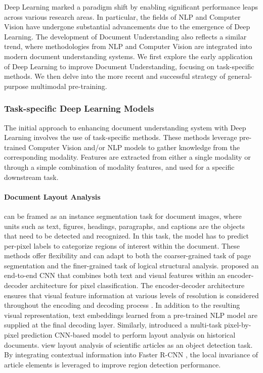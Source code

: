 Deep Learning marked a paradigm shift by enabling significant performance leaps across various research areas. In particular, the fields of \ac{NLP} and Computer Vision have undergone substantial advancements due to the emergence of Deep Learning. The development of Document Understanding also reflects a similar trend, where methodologies from \ac{NLP} and Computer Vision are integrated into modern document understanding systems. We first explore the early application of Deep Learning to improve Document Understanding, focusing on task-specific methods. We then delve into the more recent and successful strategy of general-purpose multimodal pre-training.


\subsubsection{Task-specific Deep Learning Models}

The initial approach to enhancing document understanding system with Deep Learning involves the use of task-specific methods. These methods leverage pre-trained Computer Vision and/or \ac{NLP} models to gather knowledge from the corresponding modality. Features are extracted from either a single modality or through a simple combination of modality features, and used for a specific downstream task. 


\paragraph{Document Layout Analysis} can be framed as an instance segmentation task for document images, where units such as text, figures, headings, paragraphs,
and captions are the objects that need to be detected and recognized. In this task, the model has to predict per-pixel labels to categorize regions of interest within the document. These methods offer flexibility and can adapt to both the coarser-grained task of page segmentation and the finer-grained task of logical structural analysis. \citet{yang2017learning} proposed an end-to-end \ac{CNN} that combines both text and visual features within an encoder-decoder architecture for pixel classification. The encoder-decoder architecture ensures that visual feature information at various levels of resolution is considered throughout the encoding and decoding process \citep{burt1987laplacian}. In addition to the resulting visual representation, text embeddings learned from a pre-trained \ac{NLP} model are supplied at the final decoding layer. Similarly, \citet{oliveira2018dhsegment} introduced a multi-task pixel-by-pixel prediction \ac{CNN}-based model to perform layout analysis on historical documents. \citet{soto2019visual} view layout analysis of scientific articles as an object detection task. By integrating contextual information into Faster R-CNN \citep{ren2015faster}, the local invariance of article elements is leveraged to improve region detection performance. 

